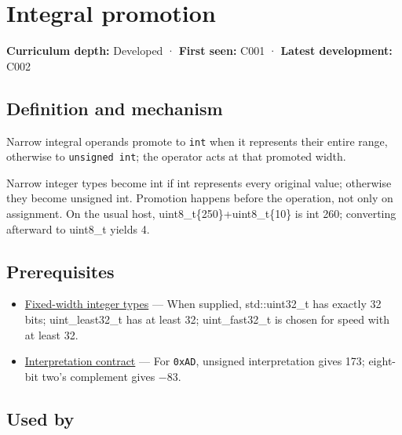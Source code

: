 \hypertarget{appendix-45303d03796a}{}\label{referencestart:appendix-45303d03796a}
\section{Integral promotion}\label{appendix-45303d03796a-integral-promotion}

\textbf{Curriculum depth:} Developed · \textbf{First seen:} C001 · \textbf{Latest development:} C002

\begin{allmightroledefinition}

\subsection{Definition and mechanism}\label{appendix-45303d03796a-definition-and-mechanism}

Narrow integral operands promote to \texttt{int} when it represents their entire range, otherwise to \texttt{unsigned\ int}; the operator acts at that promoted width.

\end{allmightroledefinition}

Narrow integer types become int if int represents every original value; otherwise they become unsigned int. Promotion happens before the operation, not only on assignment. On the usual host, uint8\_t\{250\}+uint8\_t\{10\} is int 260; converting afterward to uint8\_t yields 4.

\subsection{Prerequisites}\label{appendix-45303d03796a-prerequisites}

\begin{itemize}
\tightlist
\item
  \hyperref[appendix-cc04044b5782]{Fixed-width integer types} --- When supplied, std::uint32\_t has exactly 32 bits; uint\_least32\_t has at least 32; uint\_fast32\_t is chosen for speed with at least 32.
\item
  \hyperref[appendix-f414bd4ed05c]{Interpretation contract} --- For \texttt{0xAD}, unsigned interpretation gives 173; eight-bit two's complement gives −83.
\end{itemize}

\subsection{Used by}\label{appendix-45303d03796a-used-by}

